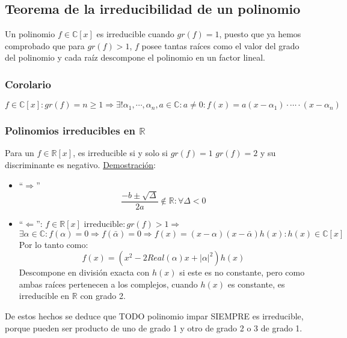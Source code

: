 \documentclass[10pt,a4paper,openright]{book}
\theoremstyle{break}
\begin{document}
\subsection{Teorema de la irreducibilidad de un polinomio}
Un polinomio $f\in \mathbb C[x]$ es irreducible cuando $gr(f)=1$, puesto que ya hemos comprobado que para $gr(f)>1$, $f$ posee tantas raíces como el valor del grado del polinomio y  cada raíz descompone el polinomio en un factor lineal.

\subsubsection*{Corolario}
$$f\in \mathbb C[x]: gr(f)=n\geq 1\Rightarrow \exists!\alpha_1,\cdots,\alpha_n, a\in \mathbb C: a\neq 0: f(x)=a(x-\alpha_1)\cdot \cdots\cdot (x-\alpha_n)$$

\subsubsection*{Polinomios irreducibles en $\mathbb R$}
Para un $f\in \mathbb R[x]$, es irreducible si y solo si $gr(f)=1$ $gr(f)=2$ y su discriminante es negativo.
\underline{Demostración}:
\begin{itemize}
\item ``$\Rightarrow$''
$$\frac{-b\pm \sqrt{\Delta}}{2a}\notin \mathbb R : \forall \Delta <0$$

\item ``$\Leftarrow$'': $f\in \mathbb R[x]\mbox{ irreducible}: gr(f)>1\Rightarrow$
$$\exists \alpha\in \mathbb C: f(\alpha)=0\Rightarrow f(\bar{\alpha})=0\Rightarrow f(x)=(x-\alpha)(x-\bar{\alpha})h(x): h(x)\in \mathbb C[x]$$
Por lo tanto como:
$$f(x)=(x^2-2Real(\alpha)x+|\alpha|^2)h(x)$$
Descompone en división exacta con $h(x)$ si este es no constante, pero como ambas raíces pertenecen a los complejos, cuando $h(x)$ es constante, es irreducible en $\mathbb R$ con grado 2.
\end{itemize}

De estos hechos se deduce que TODO polinomio impar SIEMPRE es irreducible, porque pueden ser producto de uno de grado 1 y otro de grado 2 o 3 de grado 1.
\end{document}
